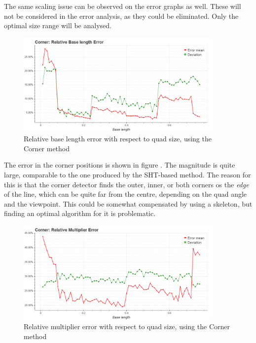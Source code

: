 The same scaling issue can be observed on the error graphs as well.
These will not be considered in the error analysis, as they could be eliminated.
Only the optimal size range will be analysed.
\begin{figure}[ht]
	\centering
	\includegraphics[width=0.9\textwidth]{figures/plots/corner_relative_base_length_error.png}
	\caption{Relative base length error with respect to quad size, using the Corner method}
	\label{fig:cornerRelBaseErr}
\end{figure}

The error in the corner positions is shown in figure .
The magnitude is quite large, comparable to the one produced by the SHT-based method.
The reason for this is that the corner detector finds the outer, inner, or both corners os the \textit{edge} of the line, which can be quite far from the centre, depending on the quad angle and the viewpoint.
This could be somewhat compensated by using a skeleton, but finding an optimal algorithm for it is problematic.
\begin{figure}[ht]
	\centering
	\includegraphics[width=0.9\textwidth]{figures/plots/corner_relative_multiplier_error.png}
	\caption{Relative multiplier error with respect to quad size, using the Corner method}
	\label{fig:cornerRelMulErr}
\end{figure}


